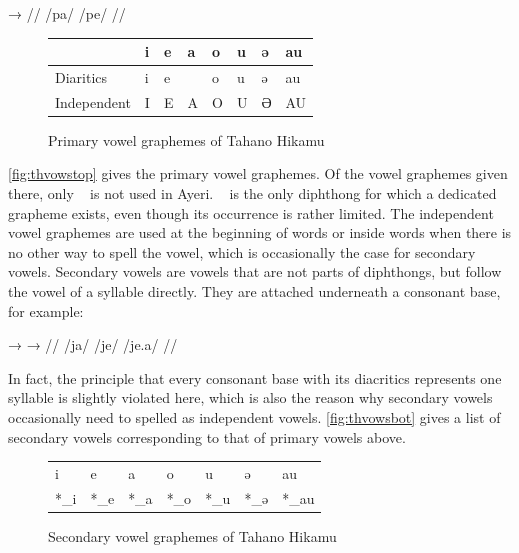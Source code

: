 \pex[everygla=\upshape\Large,glwordalign=center]\begingl
	\gla {}	→	 //
	\glb /pa/	{}	/pe/ //
\endgl\xe

\begin{figure}[th]
\caption{Primary vowel graphemes of Tahano Hikamu}

\begin{tabu} to \linewidth{H[c] X[c] X[c] X[c] X[c] X[c] X[c] X[c]}
\toprule
\tableheaderfont

	& i
	& e
	& a
	& o
	& u
	& ə
	& au
	\\
	
\toprule
	
Diaritics
	& \Tagati\huge *i
	& \Tagati\huge *e
	& \Tagati\huge {}
	& \Tagati\huge *o
	& \Tagati\huge *u
	& \Tagati\huge *ə
	& \Tagati\huge *au
	\\

\midrule

Independent
	& \Tagati\huge I
	& \Tagati\huge E
	& \Tagati\huge A
	& \Tagati\huge O
	& \Tagati\huge U
	& \Tagati\huge Ə
	& \Tagati\huge AU
	\\

\bottomrule
\end{tabu}
\label{fig:thvowstop}
\end{figure}

\autoref{fig:thvowstop} gives the primary vowel graphemes. Of the vowel 
graphemes given there, only ~ is not used in Ayeri. 
~ is the only diphthong for which a dedicated grapheme exists, 
even though its occurrence is rather limited. The independent vowel graphemes 
are used at the beginning of words or inside words when there is no other way to 
spell the vowel, which is occasionally the case for secondary vowels. Secondary 
vowels are vowels that are not parts of diphthongs, but follow the vowel of a 
syllable directly. They are attached underneath a consonant base, for example:

\pex[everygla=\upshape\Large,glwordalign=center]\begingl
	\gla {}	→		→	 //
	\glb /ja/	{}	/je/		{}	/je.a/ //
\endgl\xe

In fact, the principle that every consonant base with its diacritics represents 
one syllable is slightly violated here, which is also the reason why secondary 
vowels occasionally need to spelled as independent vowels. 
\autoref{fig:thvowsbot} gives a list of secondary vowels corresponding to that 
of primary vowels above.

\begin{figure}[ht]
\caption{Secondary vowel graphemes of Tahano Hikamu}

\begin{tabu} to \linewidth{X[c] X[c] X[c] X[c] X[c] X[c] X[c]}
\toprule
\tableheaderfont	i & e & a & o & u & ə & au \\
\rowfont{\Tagati\huge}	*\_i & *\_e & *\_a & *\_o & *\_u & *\_ə & *\_au \\

\bottomrule
\end{tabu}
\label{fig:thvowsbot}
\end{figure}


